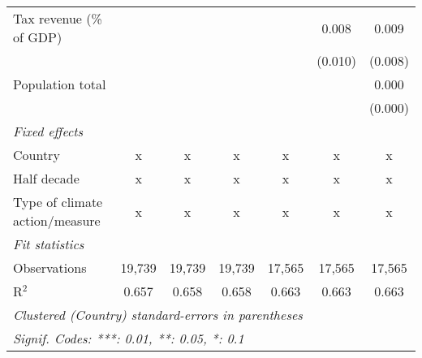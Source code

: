 \begin{tabular}{lcccccc}
   Tax revenue (\% of GDP)                                           &         &                &               &               & 0.008         & 0.009\\   
                                                                     &         &                &               &               & (0.010)       & (0.008)\\   
   Population total                                                  &         &                &               &               &               & 0.000\\   
                                                                     &         &                &               &               &               & (0.000)\\   
   \emph{Fixed effects}\\
   Country                                                           & x       & x              & x             & x             & x             & x\\  
   Half decade                                                       & x       & x              & x             & x             & x             & x\\  
   Type of climate action/measure                                    & x       & x              & x             & x             & x             & x\\  
   \midrule \emph{Fit statistics}\\
   Observations                                                      & 19,739  & 19,739         & 19,739        & 17,565        & 17,565        & 17,565\\  
   R$^2$                                                             & 0.657   & 0.658          & 0.658         & 0.663         & 0.663         & 0.663\\  
   \midrule
   \multicolumn{7}{l}{\emph{Clustered (Country) standard-errors in parentheses}}\\
   \multicolumn{7}{l}{\emph{Signif. Codes: ***: 0.01, **: 0.05, *: 0.1}}\\
\end{tabular}
\par\endgroup


